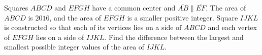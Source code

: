 Squares $ABCD$ and $EFGH$ have a common center and $\overline{AB}\parallel \overline{EF}$. The area of $ABCD$ is $2016$, and the area of $EFGH$ is a smaller positive integer. Square $IJKL$ is constructed so that each of its vertices lies on a side of $ABCD$ and each vertex of $EFGH$ lies on a side of $IJKL$. Find the difference between the largest and smallest possible integer values of the area of $IJKL$.